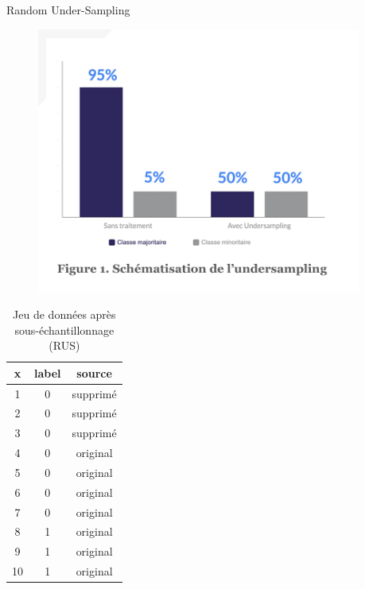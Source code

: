 \documentclass{beamer}
\begin{document}
\begin{frame}{Random Under-Sampling}
\begin{figure}
    \centering
    \includegraphics[width=0.95\textwidth]{images/RUS.png}

\end{figure}
\end{frame}

\begin{frame}
\begin{table}
\centering
\caption{Jeu de données après sous-échantillonnage (RUS)}
\begin{tabular}{|c|c|c|}
\hline
\textbf{x} & \textbf{label} & \textbf{source} \\
\hline
1   & 0 & supprimé\\
2 &  0 & supprimé \\
3 &  0 & supprimé \\
4 &  0 & original \\
5 &  0 & original \\
6 &  0 & original \\
7 &  0 & original \\
8 &  1 & original \\
9 &  1 & original \\
10 &  1 & original \\

\hline
\end{tabular}
\end{table}
\end{frame}
\end{document}
